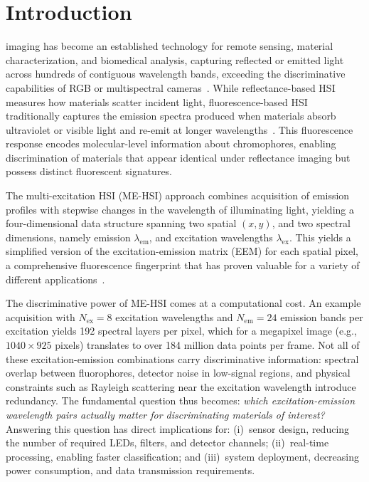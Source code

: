 \section{Introduction}
\label{sec:introduction}

 imaging has become an established technology for remote sensing, material characterization, and biomedical analysis, capturing reflected or emitted light across hundreds of contiguous wavelength bands, exceeding the discriminative capabilities of RGB or multispectral cameras~\cite{plaza2009recent,bioucas2013hyperspectral}.
While reflectance-based HSI measures how materials scatter
incident light, fluorescence-based HSI traditionally captures the emission spectra produced when materials absorb ultraviolet or visible light and re-emit at longer wavelengths~\cite{lakowicz2006principles}.
This fluorescence response encodes molecular-level information about chromophores, enabling discrimination of materials that appear identical under reflectance imaging but possess distinct fluorescent signatures.

The multi-excitation HSI (ME-HSI) approach combines
acquisition of emission profiles with stepwise changes in the
wavelength of illuminating light, yielding a four-dimensional data structure spanning two spatial $(x, y)$, and two spectral dimensions, namely emission $\lambda_{\text{em}}$, and excitation wavelengths $\lambda_{\text{ex}}$.
This yields a simplified version of the excitation-emission matrix (EEM) for each spatial pixel, a comprehensive fluorescence fingerprint that has proven valuable for a variety of different applications~\cite{lakowicz2006principles}.

The discriminative power of ME-HSI comes at a computational cost.
An example acquisition with $N_{\text{ex}} = 8$ excitation wavelengths and $N_{\text{em}} = 24$ emission bands per excitation yields 192 spectral layers per pixel, which for a megapixel image (e.g., $1040 \times 925$ pixels) translates to over 184 million data points per frame.
Not all of these excitation-emission combinations carry discriminative information: spectral overlap between fluorophores, detector noise in low-signal regions, and physical constraints such as Rayleigh scattering near the excitation wavelength introduce redundancy.
The fundamental question thus becomes: \emph{which excitation-emission wavelength pairs actually matter for discriminating materials of interest?}
Answering this question has direct implications for:
(i)~sensor design, reducing the number of required LEDs, filters, and detector channels;
(ii)~real-time processing, enabling faster classification; and
(iii)~system deployment, decreasing power consumption, and data transmission requirements.

